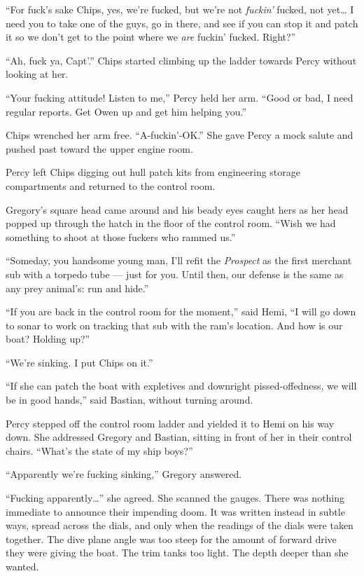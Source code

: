 \documentclass[
]{scrbook}
\begin{document}
``For fuck's sake Chips, yes, we're fucked, but we're not \emph{fuckin'}
fucked, not yet\ldots{} I need you to take one of the guys, go in there,
and see if you can stop it and patch it so we don't get to the point
where we \emph{are} fuckin' fucked. Right?''

``Ah, fuck ya, Capt'.'' Chips started climbing up the ladder towards
Percy without looking at her.

``Your fucking attitude! Listen to me,'' Percy held her arm. ``Good or
bad, I need regular reports. Get Owen up and get him helping you.''

Chips wrenched her arm free. ``A-fuckin'-OK.'' She gave Percy a mock
salute and pushed past toward the upper engine room.

Percy left Chips digging out hull patch kits from engineering storage
compartments and returned to the control room.

Gregory's square head came around and his beady eyes caught hers as her
head popped up through the hatch in the floor of the control room.
``Wish we had something to shoot at those fuckers who rammed us.''

``Someday, you handsome young man, I'll refit the \emph{Prospect} as the
first merchant sub with a torpedo tube --- just for you. Until then, our
defense is the same as any prey animal's: run and hide.''

``If you are back in the control room for the moment,'' said Hemi, ``I
will go down to sonar to work on tracking that sub with the ram's
location. And how is our boat? Holding up?''

``We're sinking. I put Chips on it.''

``If she can patch the boat with expletives and downright
pissed-offedness, we will be in good hands,'' said Bastian, without
turning around.

Percy stepped off the control room ladder and yielded it to Hemi on his
way down. She addressed Gregory and Bastian, sitting in front of her in
their control chairs. ``What's the state of my ship boys?''

``Apparently we're fucking sinking,'' Gregory answered.

``Fucking apparently\ldots{}'' she agreed. She scanned the gauges. There
was nothing immediate to announce their impending doom. It was written
instead in subtle ways, spread across the dials, and only when the
readings of the dials were taken together. The dive plane angle was too
steep for the amount of forward drive they were giving the boat. The
trim tanks too light. The depth deeper than she wanted.
\end{document}
